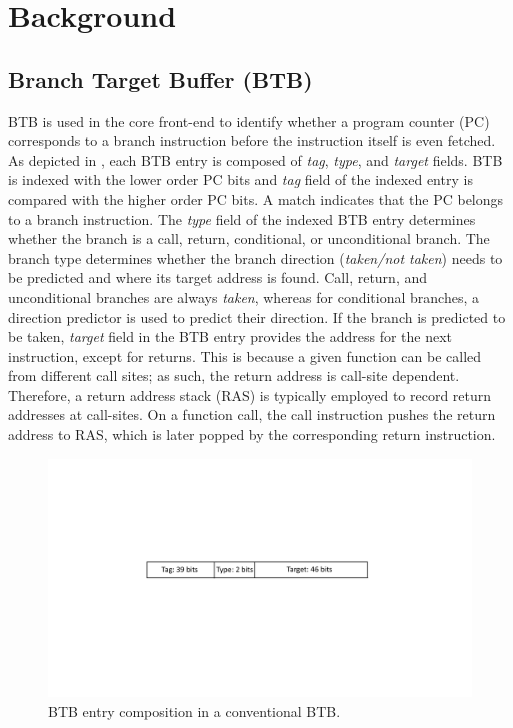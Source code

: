 \section{Background}
\label{sec:background}

\subsection{Branch Target Buffer (BTB)}
BTB is used in the core front-end to identify whether a program counter (PC) corresponds to a branch instruction before the instruction itself is even fetched. As depicted in , each BTB entry is composed of \textit{tag}, \textit{type}, and \textit{target} fields. BTB is indexed with the lower order PC bits and \textit{tag} field of the indexed entry is compared with the higher order PC bits. A match indicates that the PC belongs to a branch instruction. The \textit{type} field of the indexed BTB entry determines whether the branch is a call, return, conditional, or unconditional branch. The branch type determines whether the branch direction (\textit{taken/not taken}) needs to be predicted and where its target address is found. Call, return, and unconditional branches are always \textit{taken}, whereas for conditional branches, a direction predictor is used to predict their direction. If the branch is predicted to be taken, \textit{target} field in the BTB entry provides the address for the next instruction, except for returns. This is because a given function can be called from different call sites; as such, the return address is call-site dependent. Therefore, a return address stack (RAS) is typically employed to record return addresses at call-sites. On a function call, the call instruction pushes the return address to RAS, which is later popped by the corresponding return instruction.

\begin{figure}
\centering
\includegraphics[width=0.8\columnwidth, trim=220 260 230 230, clip]{figures/baselineBTB1.pdf}
\caption {BTB entry composition in a conventional BTB. }
\label{fig:conv-btb}
\end{figure}

